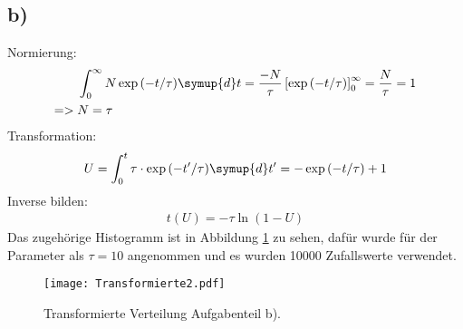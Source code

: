 \subsection{b)}
Normierung:
\begin{align*}
  &\int_0^{\infty}N \exp{(-t/\tau)} \symup{d}t = \frac{-N}{\tau} \left[\exp{(-t/\tau)}\right]_0^{\infty} = \frac{N}{\tau} =1 \\
  => \; &N = \tau
\end{align*}
Transformation:
\begin{align*}
  U = \int_0^{t} \tau \cdot \exp{(-t'/\tau)} \symup{d}t' = -\exp{(-t/\tau)}+1 \\
\end{align*}
Inverse bilden:
\begin{align*}
  t(U) = - \tau \ln{(1-U)}
\end{align*}
Das zugehörige Histogramm ist in Abbildung \ref{5.b} zu sehen, dafür wurde für der Parameter als $\tau = 10$ angenommen und es
wurden 10000 Zufallswerte verwendet.
\begin{figure}[h]
  \centering
  \texttt{[image: Transformierte2.pdf]}
  \caption{Transformierte Verteilung Aufgabenteil b).}
  \label{5.b}
\end{figure}

